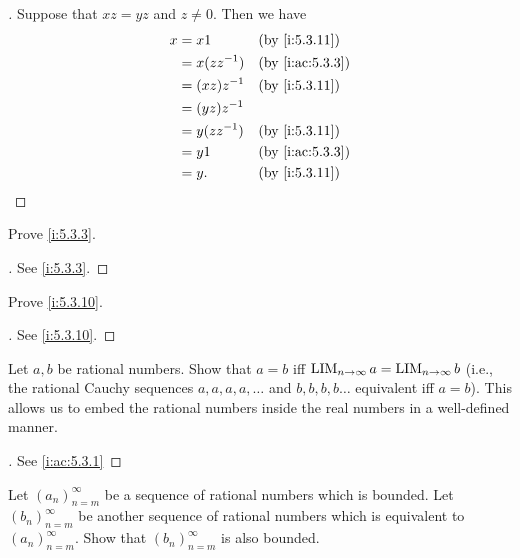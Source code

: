 \begin{proof}[]
  Suppose that \(xz = yz\) and \(z \neq 0\).
  Then we have
  \begin{align*}
    x & = x 1          &  & \by{i:5.3.11}   \\
      & = x (z z^{-1}) &  & \by{i:ac:5.3.3} \\
      & = (xz) z^{-1}  &  & \by{i:5.3.11}   \\
      & = (yz) z^{-1}  &  &                 \\
      & = y (z z^{-1}) &  & \by{i:5.3.11}   \\
      & = y 1          &  & \by{i:ac:5.3.3} \\
      & = y.           &  & \by{i:5.3.11}
  \end{align*}
\end{proof}

\exercisesection

\begin{ex}\label{i:ex:5.3.1}
  Prove \cref{i:5.3.3}.
\end{ex}

\begin{proof}[]
  See \cref{i:5.3.3}.
\end{proof}

\begin{ex}\label{i:ex:5.3.2}
  Prove \cref{i:5.3.10}.
\end{ex}

\begin{proof}[]
  See \cref{i:5.3.10}.
\end{proof}

\begin{ex}\label{i:ex:5.3.3}
  Let \(a, b\) be rational numbers.
  Show that \(a = b\) iff \(\operatorname*{LIM}_{n \to \infty} a = \operatorname*{LIM}_{n \to \infty} b\) (i.e., the rational Cauchy sequences \(a, a, a, a, \dots\) and \(b, b, b, b \dots\) equivalent iff \(a = b\)).
  This allows us to embed the rational numbers inside the real numbers in a well-defined manner.
\end{ex}

\begin{proof}[]
  See \cref{i:ac:5.3.1}
\end{proof}

\begin{ex}\label{i:ex:5.3.4}
  Let \((a_n)_{n = m}^{\infty}\) be a sequence of rational numbers which is bounded.
  Let \((b_n)_{n = m}^{\infty}\) be another sequence of rational numbers which is equivalent to \((a_n)_{n = m}^{\infty}\).
  Show that \((b_n)_{n = m}^{\infty}\) is also bounded.
\end{ex}

